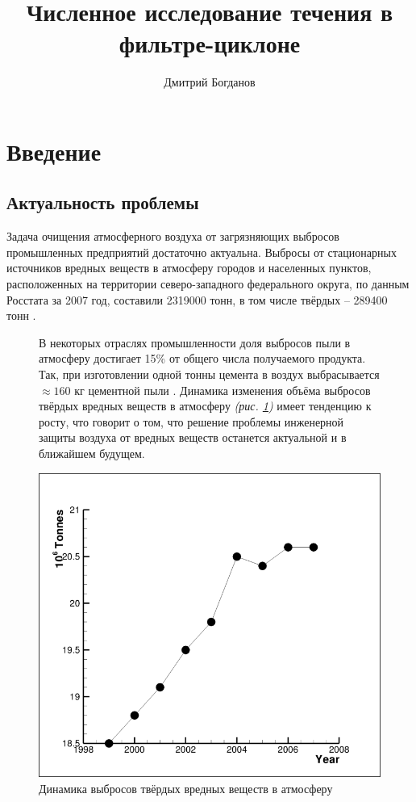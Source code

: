 \documentclass[pdftex,a4paper,12pt]{article}
\title{Численное исследование течения в фильтре-циклоне}
\author{Дмитрий Богданов}
\date{}
\begin{document}

\tableofcontents
\newpage
\section{Введение}
	\subsection{Актуальность проблемы}
		\hspace{2em} 	Задача очищения атмосферного воздуха от загрязняющих выбросов промышленных предприятий достаточно актуальна. Выбросы от стационарных источников вредных веществ в атмосферу городов и населенных пунктов, расположенных на территории северо-западного федерального округа,  по данным Росстата за 2007 год,  составили 2319000 тонн, в том числе твёрдых -- 289400 тонн \cite{emissionInfoRussian}.
		\begin{figure}[ht]
			\vspace{-1em}
			\begin{minipage}[b]{0.46\linewidth}
				В некоторых отраслях промышленности доля выбросов пыли в атмосферу достигает 15\% от общего числа получаемого продукта. Так, при изготовлении одной тонны цемента в воздух выбрасывается $\approx 160$ кг цементной пыли \cite{emissionInfoEurope}.
				Динамика изменения объёма выбросов твёрдых вредных веществ в атмосферу \textit{(рис. \ref{figure:atmosphereDynamic})} имеет тенденцию к росту, что говорит о том, что решение проблемы инженерной защиты воздуха от вредных веществ останется актуальной и в ближайшем будущем. 
			\end{minipage}
			\hspace{0.01\linewidth}
			\begin{minipage}[b]{0.48\linewidth}
				\centering
				\includegraphics[scale=0.24]{atmosphereDynamic}
				\caption{Динамика выбросов твёрдых вредных веществ в атмосферу \cite{emissionInfoRussian}}
				\label{figure:atmosphereDynamic}
			\end{minipage}
		\end{figure}
		\vspace{-1em}
	
\end{document}
